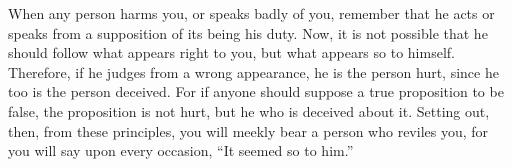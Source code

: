When any  person harms you, or  speaks badly of  you, remember that he  acts or
speaks from a supposition  of its being his duty. Now, it  is not possible that
he should  follow what appears  right to you, but  what appears so  to himself.
Therefore, if he judges  from a wrong appearance, he is  the person hurt, since
he too is the person deceived. For  if anyone should suppose a true proposition
to be  false, the proposition  is not  hurt, but he  who is deceived  about it.
Setting out,  then, from these  principles, you will  meekly bear a  person who
reviles you, for you will say upon every occasion, ``It seemed so to him.''
